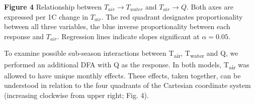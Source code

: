 \documentclass{article}
\begin{document}
\begin{center}
\textbf{Figure 4} Relationship between $T_{air}\rightarrow T_{water}$ and $T_{air}\rightarrow Q$. Both axes are expressed per 1\degree C change in $T_{air}$. The red quadrant designates proportionality between all three variables, the blue inverse proportionality between each response and $T_{air}$. Regression lines indicate slopes significant at $\alpha=0.05$.
\end{center}

To examine possible sub-season interactions between T\textsubscript{air}, T\textsubscript{water} and Q, we performed an additional DFA with Q as the response. In both models, T\textsubscript{air} was allowed to have unique monthly effects. These effects, taken together, can be understood in relation to the four quadrants of the Cartesian coordinate system (increasing clockwise from upper right; Fig. 4).
\end{document}

